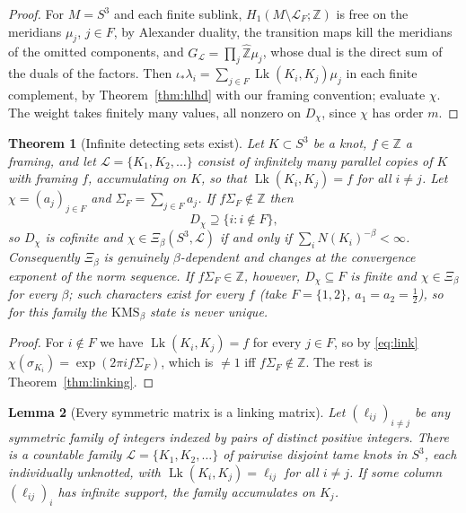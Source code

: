 \documentclass[11pt]{amsart}
\numberwithin{equation}{section}
\newtheorem{theorem}{Theorem}[section]
\newtheorem{lemma}[theorem]{Lemma}
\theoremstyle{definition}
\theoremstyle{remark}
\newcommand{\Z}{\mathbb{Z}}
\newcommand{\hZ}{\widehat{\Z}}
\newcommand{\cL}{\mathcal{L}}
\newcommand{\Lk}{\operatorname{Lk}}
\begin{document}
\begin{proof}
For $M=S^3$ and each finite sublink, $H_1(M\setminus\cL_F;\Z)$ is free on the meridians
$\mu_j$, $j\in F$, by Alexander duality, the transition maps kill the meridians of the
omitted components, and $G_\cL=\prod_j\hZ\mu_j$, whose dual is the direct sum of the duals of
the factors. Then $\iota_*\lambda_i=\sum_{j\in F}\Lk(K_i,K_j)\mu_j$ in each finite complement,
by Theorem~\ref{thm:hlhd} with our framing convention; evaluate $\chi$. The weight takes
finitely many values, all nonzero on $D_\chi$, since $\chi$ has order $m$.
\end{proof}

\begin{theorem}[Infinite detecting sets exist]\label{thm:infinite}
Let $K\subset S^3$ be a knot, $f\in\Z$ a framing, and let $\cL=\{K_1,K_2,\dots\}$ consist of
infinitely many parallel copies of $K$ with framing $f$, accumulating on $K$, so that
$\Lk(K_i,K_j)=f$ for all $i\ne j$. Let $\chi=(a_j)_{j\in F}$ and $\Sigma_F=\sum_{j\in F}a_j$.
If $f\Sigma_F\notin\Z$ then
\[
D_\chi\supseteq\{i:i\notin F\},
\]
so $D_\chi$ is cofinite and $\chi\in\Xi_\beta(S^3,\cL)$ if and only if
$\sum_iN(K_i)^{-\beta}<\infty$. Consequently $\Xi_\beta$ is genuinely $\beta$-dependent and
changes at the convergence exponent of the norm sequence. If $f\Sigma_F\in\Z$, however,
$D_\chi\subseteq F$ is finite and $\chi\in\Xi_\beta$ for every $\beta$; such characters exist
for every $f$ (take $F=\{1,2\}$, $a_1=a_2=\tfrac12$), so for this family the
$\mathrm{KMS}_\beta$ state is never unique.
\end{theorem}

\begin{proof}
For $i\notin F$ we have $\Lk(K_i,K_j)=f$ for every $j\in F$, so by \eqref{eq:link}
$\chi(\sigma_{K_i})=\exp(2\pi if\Sigma_F)$, which is $\ne1$ iff $f\Sigma_F\notin\Z$. The rest
is Theorem~\ref{thm:linking}.
\end{proof}

\begin{lemma}[Every symmetric matrix is a linking matrix]\label{lem:realize}
Let $(\ell_{ij})_{i\ne j}$ be any symmetric family of integers indexed by pairs of distinct
positive integers. There is a countable family $\cL=\{K_1,K_2,\dots\}$ of pairwise disjoint
tame knots in $S^3$, each individually unknotted, with $\Lk(K_i,K_j)=\ell_{ij}$ for all
$i\ne j$. If some column $(\ell_{ij})_i$ has infinite support, the family accumulates on
$K_j$.
\end{lemma}
\end{document}
